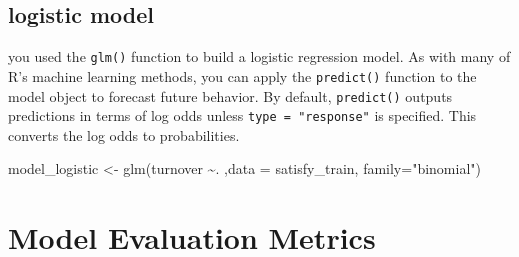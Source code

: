 \documentclass[
]{book}
\newenvironment{Shaded}{\begin{snugshade}}{\end{snugshade}}
\newcommand{\AttributeTok}[1]{\textcolor[rgb]{0.77,0.63,0.00}{#1}}
\newcommand{\CommentTok}[1]{\textcolor[rgb]{0.56,0.35,0.01}{\textit{#1}}}
\newcommand{\DecValTok}[1]{\textcolor[rgb]{0.00,0.00,0.81}{#1}}
\newcommand{\FunctionTok}[1]{\textcolor[rgb]{0.00,0.00,0.00}{#1}}
\newcommand{\NormalTok}[1]{#1}
\newcommand{\OtherTok}[1]{\textcolor[rgb]{0.56,0.35,0.01}{#1}}
\newcommand{\SpecialCharTok}[1]{\textcolor[rgb]{0.00,0.00,0.00}{#1}}
\newcommand{\StringTok}[1]{\textcolor[rgb]{0.31,0.60,0.02}{#1}}
\begin{document}
\begin{Shaded}
\end{Shaded}

\hypertarget{logistic-model-1}{%
\subsection{logistic model}\label{logistic-model-1}}

you used the \texttt{glm()} function to build a logistic regression model. As with many of R's machine learning methods, you can apply the \texttt{predict()} function to the model object to forecast future behavior. By default, \texttt{predict()} outputs predictions in terms of log odds unless \texttt{type\ =\ "response"} is specified. This converts the log odds to probabilities.

\begin{Shaded}
\begin{Highlighting}[]
\NormalTok{model\_logistic }\OtherTok{\textless{}{-}} \FunctionTok{glm}\NormalTok{(turnover }\SpecialCharTok{\textasciitilde{}}\NormalTok{. ,}\AttributeTok{data =}\NormalTok{ satisfy\_train, }
                      \AttributeTok{family=}\StringTok{"binomial"}\NormalTok{)}
\end{Highlighting}
\end{Shaded}

\hypertarget{model-evaluation-metrics-1}{%
\section{Model Evaluation Metrics}\label{model-evaluation-metrics-1}}
\end{document}

